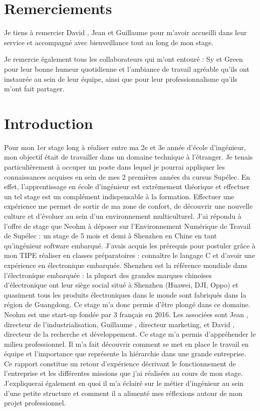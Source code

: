 \documentclass[a4paper, 11pt]{report}
\begin{document}
\renewcommand{\contentsname}{Sommaire} %

\tableofcontents

\chapter*{Remerciements}

Je tiens à remercier David , Jean  et Guillaume  pour m’avoir accueilli dans leur service et accompagné avec bienveillance tout au long de mon stage.

Je remercie également tous les collaborateurs qui m’ont entouré : Sy et Green pour leur bonne humeur quotidienne et l’ambiance de travail agréable qu’ils ont instaurée au sein de leur équipe, ainsi que pour leur professionnalisme qu’ils m’ont fait partager.

\chapter{Introduction}
Pour mon 1er stage long à réaliser entre ma 2e et 3e année d’école d’ingénieur, mon objectif était de travailler dans un domaine technique à l’étranger. Je tenais particulièrement à occuper un poste dans lequel je pourrai appliquer les connaissances acquises en sein de mes 2 premières années du cursus Supélec. En effet, l’apprentissage en école d’ingénieur est extrêmement théorique et effectuer un tel stage est un complément indispensable à la formation. Effectuer une expérience me permet de sortir de ma zone de confort, de découvrir une nouvelle culture et d’évoluer au sein d’un environnement multiculturel. 
J’ai répondu à l’offre de stage que Neohm à déposer sur l’Environnement Numérique de Travail de Supélec : un stage de 5 mois et demi à Shenzhen en Chine en tant qu’ingénieur software embarqué. J’avais acquis les prérequis pour postuler grâce à mon TIPE réaliser en classes préparatoires : connaître le langage C et d’avoir une expérience en électronique embarquée.
Shenzhen est la référence mondiale dans l’électronique embarquée : la plupart des grandes marques chinoises d’électronique ont leur siège social situé à Shenzhen (Huawei, DJI, Oppo) et quasiment tous les produits électroniques dans le monde sont fabriqués dans la région de Guangdong. Ce stage m’a donc permis d’être plongé dans ce domaine.
Neohm est une start-up fondée par 3 français en 2016. Les associées sont Jean , directeur de l’industrialisation, Guillaume , directeur marketing, et David , directeur de la recherche et développement. 
Ce stage m’a permis d’appréhender le milieu professionnel. Il m’a fait découvrir comment se met en place le travail en équipe et l’importance que représente la hiérarchie dans une grande entreprise.
Ce rapport constitue un retour d’expérience décrivant le fonctionnement de l’entreprise et les différentes missions que j’ai réalisées au cours de mon stage. J’expliquerai également en quoi il m’a éclairé sur le métier d’ingénieur au sein d’une petite structure et comment il a alimenté mes réflexions autour de mon projet professionnel.
\end{document}

